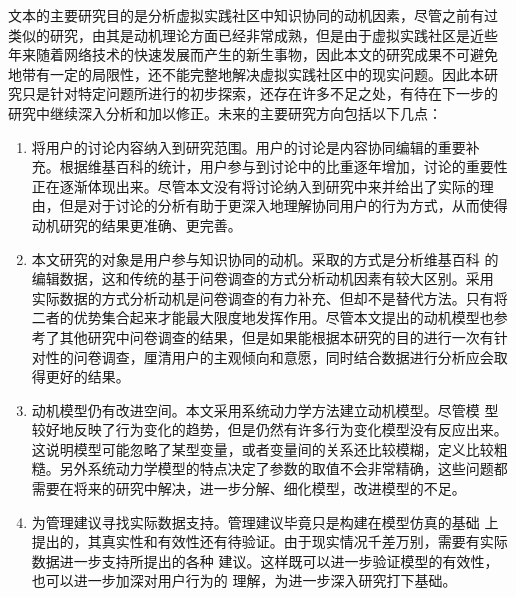 文本的主要研究目的是分析虚拟实践社区中知识协同的动机因素，尽管之前有过
类似的研究，由其是动机理论方面已经非常成熟，但是由于虚拟实践社区是近些
年来随着网络技术的快速发展而产生的新生事物，因此本文的研究成果不可避免
地带有一定的局限性，还不能完整地解决虚拟实践社区中的现实问题。因此本研
究只是针对特定问题所进行的初步探索，还存在许多不足之处，有待在下一步的
研究中继续深入分析和加以修正。未来的主要研究方向包括以下几点：
\begin{enumerate}
\item 将用户的讨论内容纳入到研究范围。用户的讨论是内容协同编辑的重要补
  充。根据维基百科的统计，用户参与到讨论中的比重逐年增加，讨论的重要性
  正在逐渐体现出来。尽管本文没有将讨论纳入到研究中来并给出了实际的理
  由，但是对于讨论的分析有助于更深入地理解协同用户的行为方式，从而使得
  动机研究的结果更准确、更完善。
\item 本文研究的对象是用户参与知识协同的动机。采取的方式是分析维基百科
  的编辑数据，这和传统的基于问卷调查的方式分析动机因素有较大区别。采用
  实际数据的方式分析动机是问卷调查的有力补充、但却不是替代方法。只有将
  二者的优势集合起来才能最大限度地发挥作用。尽管本文提出的动机模型也参
  考了其他研究中问卷调查的结果，但是如果能根据本研究的目的进行一次有针
  对性的问卷调查，厘清用户的主观倾向和意愿，同时结合数据进行分析应会取
  得更好的结果。
\item 动机模型仍有改进空间。本文采用系统动力学方法建立动机模型。尽管模
  型较好地反映了行为变化的趋势，但是仍然有许多行为变化模型没有反应出来。
  这说明模型可能忽略了某型变量，或者变量间的关系还比较模糊，定义比较粗
  糙。另外系统动力学模型的特点决定了参数的取值不会非常精确，这些问题都
  需要在将来的研究中解决，进一步分解、细化模型，改进模型的不足。
\item 为管理建议寻找实际数据支持。管理建议毕竟只是构建在模型仿真的基础
  上提出的，其真实性和有效性还有待验证。由于现实情况千差万别，需要有实际数据进一步支持所提出的各种
  建议。这样既可以进一步验证模型的有效性，也可以进一步加深对用户行为的
  理解，为进一步深入研究打下基础。
\end{enumerate}
